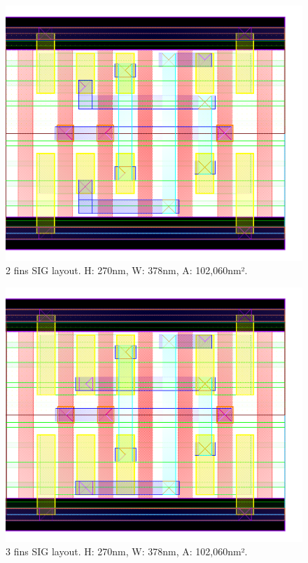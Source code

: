 \documentclass[diss,pgmicro,english]{iiufrgs}
\begin{document}
\begin{figure}[]
\centering
\includegraphics[width=\textwidth,height=\textheight,keepaspectratio]{SIG2F.png}
\caption{2 fins SIG layout. H: 270nm, W: 378nm, A: 102,060nm².}
\label{fig:SIG2F}
\end{figure}

\begin{figure}[]
\centering
\includegraphics[width=\textwidth,height=\textheight,keepaspectratio]{SIG3F.png}
\caption{3 fins SIG layout. H: 270nm, W: 378nm, A: 102,060nm².}
\label{fig:SIG3F}
\end{figure}
\end{document}
